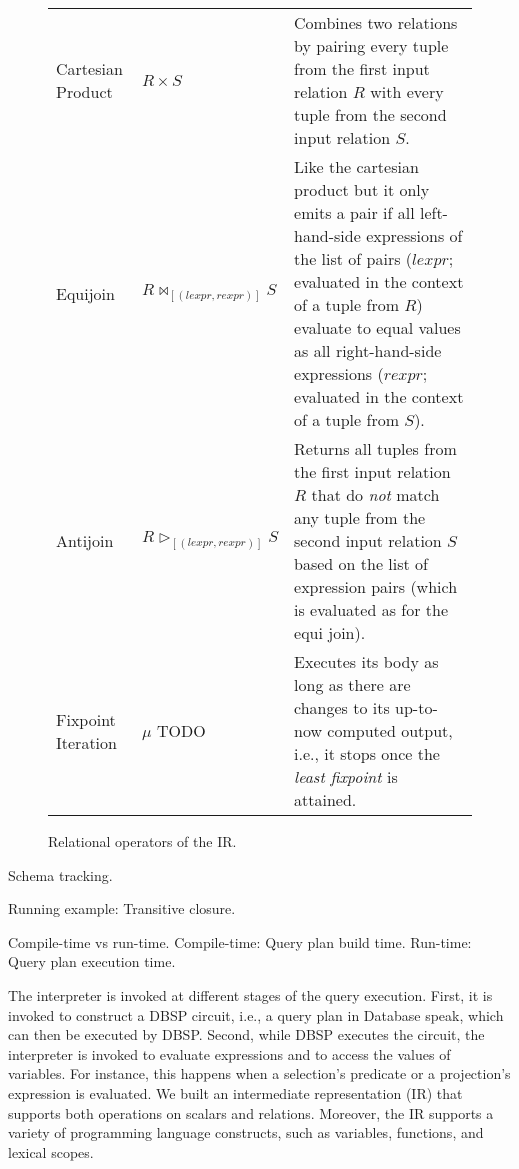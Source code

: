\begin{figure}[htpb]
\begin{tabular}{@{}p{}p{}p{}@{}}
		Cartesian Product  & \(R \times S\)                                              & Combines two relations by pairing every tuple from the first input relation \(R\) with every tuple from the second input relation \(S\).                                                                                                                                                                          \\
		Equijoin           & \(R \bowtie_{[(\mathit{lexpr}, \mathit{rexpr})]} S\)        & Like the cartesian product but it only emits a pair if all left-hand-side expressions of the list of pairs (\(\mathit{lexpr}\); evaluated in the context of a tuple from \(R\)) evaluate to equal values as all right-hand-side expressions (\(\mathit{rexpr}\); evaluated in the context of a tuple from \(S\)). \\
		Antijoin           & \(R \triangleright_{[(\mathit{lexpr}, \mathit{rexpr})]} S\) & Returns all tuples from the first input relation \(R\) that do \emph{not} match any tuple from the second input relation \(S\) based on the list of expression pairs (which is evaluated as for the equi join).                                                                                                   \\
		Fixpoint Iteration & \(\mu\) TODO                                                & Executes its body as long as there are changes to its up-to-now computed output, i.e., it stops once the \emph{least fixpoint} is attained.                                                                                                                                                                       \\
		\bottomrule
	\end{tabular}
	\caption{Relational operators of the \ac{IR}.}\label{tab:ir-operators}
\end{figure}

Schema tracking.

Running example: Transitive closure.

Compile-time vs run-time.
Compile-time: Query plan build time.
Run-time: Query plan execution time.

The interpreter is invoked at different stages of the query execution.
First, it is invoked to construct a DBSP circuit, i.e., a query plan in
Database speak, which can then be executed by DBSP.
Second, while DBSP executes the circuit, the interpreter is invoked to
evaluate expressions and to access the values of variables. For instance,
this happens when a selection's predicate or a projection's expression
is evaluated.
We built an intermediate representation (IR) that supports both operations
on scalars and relations. Moreover, the IR supports a variety of programming
language constructs, such as variables, functions, and lexical scopes.

